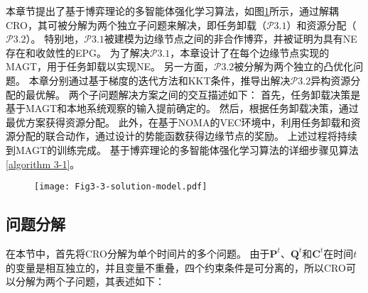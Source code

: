 本章节提出了基于博弈理论的多智能体强化学习算法，如图\ref{fig 3-3}所示，通过解耦CRO，其可被分解为两个独立子问题来解决，即任务卸载（$\mathcal{P}3.1$）和资源分配（$\mathcal{P}3.2$）。
特别地，$\mathcal{P}3.1$被建模为边缘节点之间的非合作博弈，并被证明为具有NE存在和收敛性的EPG。
为了解决$\mathcal{P}3.1$，本章设计了在每个边缘节点实现的MAGT，用于任务卸载以实现NE。
另一方面，$\mathcal{P}3.2$被分解为两个独立的凸优化问题。
本章分别通过基于梯度的迭代方法和KKT条件，推导出解决$\mathcal{P}3.2$异构资源分配的最优解。
两个子问题解决方案之间的交互描述如下：
首先，任务卸载决策是基于MAGT和本地系统观察的输入提前确定的。
然后，根据任务卸载决策，通过最优方案获得资源分配。
此外，在基于NOMA的VEC环境中，利用任务卸载和资源分配的联合动作，通过设计的势能函数获得边缘节点的奖励。
上述过程将持续到MAGT的训练完成。
基于博弈理论的多智能体强化学习算法的详细步骤见算法\ref{algorithm 3-1}。

\begin{figure}[h]
\centering
  \texttt{[image: Fig3-3-solution-model.pdf]}
  \label{fig 3-3}
\end{figure} 

\subsection{问题分解}
在本节中，首先将CRO分解为单个时间片的多个问题。
由于$\mathbf{P}^{t}$、$\mathbf{Q}^{t}$和$\mathbf{C}^{t}$在时间$t$的变量是相互独立的，并且变量不重叠，四个约束条件是可分离的，所以CRO可以分解为两个子问题，其表述如下：

